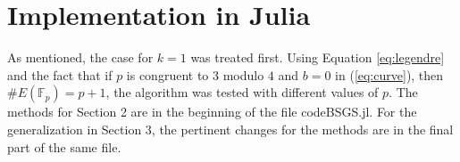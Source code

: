 \documentclass[letter,11pt,reqno]{article}
\theoremstyle{definition}
\theoremstyle{definition}
\theoremstyle{definition}
\theoremstyle{remark}
\theoremstyle{definition}
\theoremstyle{definition}
\newcommand{\Fp}{\mathbb{F}_p}
\newcommand*{\myfont}{\fontfamily{<cmss>}\selectfont}
\begin{document}
\section{Implementation in Julia}

As mentioned, the case for $k=1$ was treated first. Using Equation \ref{eq:legendre} and the fact that if $p$ is congruent to $3$ modulo $4$ and $b=0$ in (\ref{eq:curve}), then $\#E(\Fp) = p+1$, the algorithm was tested with different values of $p$. The methods for Section 2 are in the beginning of the file {\myfont codeBSGS.jl}. For the generalization in Section 3, the pertinent changes for the methods are in the final part of the same file. 
\newpage

%



%

\printbibliography
\end{document}
